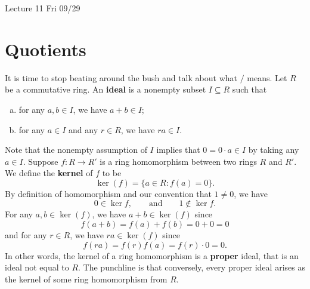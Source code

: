 \documentclass{article}
\newcommand{\add}[1]{{\color{blue} #1}}
\begin{document}
    
   \begin{center}
    \add{Lecture 11 Fri 09/29}
    \end{center}

\section{Quotients}

It is time to stop beating around the bush and talk about what $/$ means. Let $R$ be a commutative ring. An \textbf{ideal} is a nonempty subset $I\subseteq R$ such that
\begin{enumerate}[(a)]
    \item for any $a,b\in I$, we have $a + b \in I$;
    \item for any $a\in I$ and any $r\in R$, we have $ra\in I$.
\end{enumerate}
Note that the nonempty assumption of $I$ implies that $0 = 0\cdot a\in I$ by taking any $a\in I$.
Suppose $f:R\rightarrow R'$ is a ring homomorphism between two rings $R$ and $R'$. We define the \textbf{kernel} of $f$ to be $$\ker(f) = \{a\in R\colon f(a) = 0\}.$$
By definition of homomorphism and our convention that $1\neq 0$, we have $$0\in\ker f,\qquad\mbox{and}\qquad 1\notin \ker f.$$
For any $a,b\in \ker(f)$, we have $a + b\in\ker(f)$ since
$$f(a+b) = f(a) + f(b) = 0 + 0 = 0$$
and for any $r\in R$, we have $ra\in\ker(f)$ since
$$f(ra) = f(r)f(a) = f(r)\cdot 0 = 0.$$
In other words, the kernel of a ring homomorphism is a \textbf{proper} ideal, that is an ideal not equal to $R$. The punchline is that conversely, every proper ideal arises as the kernel of some ring homomorphism from $R$.
\end{document}
